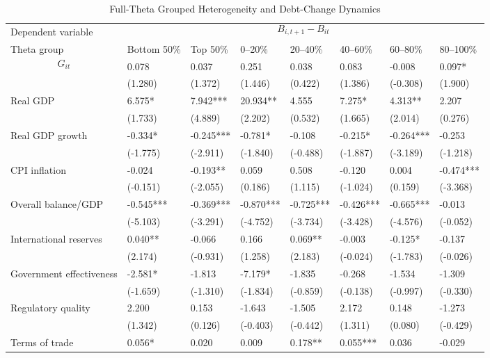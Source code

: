 \begin{table}[H]\centering
\begin{threeparttable}
\caption{Full-Theta Grouped Heterogeneity and Debt-Change Dynamics}
\label{tab:theta_group_heterogeneity_debt}
\scriptsize
\begin{tabularx}{\textwidth}{lYYYYYYY}
\toprule
Dependent variable &  \\
\cmidrule(lr){2-8}
Theta group & Bottom 50\% & Top 50\% & 0--20\% & 20--40\% & 40--60\% & 60--80\% & 80--100\% \\
\midrule
$$G_{it}$$ & 0.078 & 0.037 & 0.251 & 0.038 & 0.083 & -0.008 & 0.097* \\
  & (1.280) & (1.372) & (1.446) & (0.422) & (1.386) & (-0.308) & (1.900) \\
Real GDP & 6.575* & 7.942*** & 20.934** & 4.555 & 7.275* & 4.313** & 2.207 \\
  & (1.733) & (4.889) & (2.202) & (0.532) & (1.665) & (2.014) & (0.276) \\
Real GDP growth & -0.334* & -0.245*** & -0.781* & -0.108 & -0.215* & -0.264*** & -0.253 \\
  & (-1.775) & (-2.911) & (-1.840) & (-0.488) & (-1.887) & (-3.189) & (-1.218) \\
CPI inflation & -0.024 & -0.193** & 0.059 & 0.508 & -0.120 & 0.004 & -0.474*** \\
  & (-0.151) & (-2.055) & (0.186) & (1.115) & (-1.024) & (0.159) & (-3.368) \\
Overall balance/GDP & -0.545*** & -0.369*** & -0.870*** & -0.725*** & -0.426*** & -0.665*** & -0.013 \\
  & (-5.103) & (-3.291) & (-4.752) & (-3.734) & (-3.428) & (-4.576) & (-0.052) \\
International reserves & 0.040** & -0.066 & 0.166 & 0.069** & -0.003 & -0.125* & -0.137 \\
  & (2.174) & (-0.931) & (1.258) & (2.183) & (-0.024) & (-1.783) & (-0.026) \\
Government effectiveness & -2.581* & -1.813 & -7.179* & -1.835 & -0.268 & -1.534 & -1.309 \\
  & (-1.659) & (-1.310) & (-1.834) & (-0.859) & (-0.138) & (-0.997) & (-0.330) \\
Regulatory quality & 2.200 & 0.153 & -1.643 & -1.505 & 2.172 & 0.148 & -1.273 \\
  & (1.342) & (0.126) & (-0.403) & (-0.442) & (1.311) & (0.080) & (-0.429) \\
Terms of trade & 0.056* & 0.020 & 0.009 & 0.178** & 0.055*** & 0.036 & -0.029 \\

\end{tabularx}
\end{threeparttable}
\end{table}
